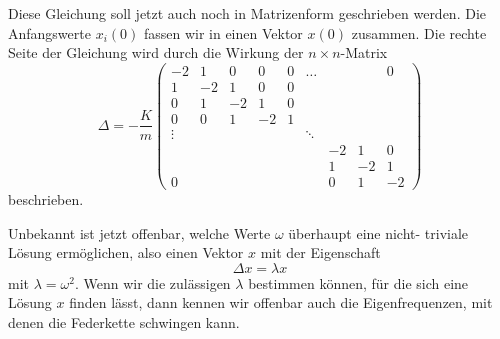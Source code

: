 Diese Gleichung soll jetzt auch noch in Matrizenform geschrieben werden.
Die Anfangswerte $x_i(0)$ fassen wir in einen Vektor $x(0)$ zusammen.
Die rechte Seite der Gleichung wird durch die Wirkung der $n\times n$-Matrix
\[
\Delta=
-\frac{K}{m}
\begin{pmatrix}
-2&1&0&0&0&\dots&&&0\\
1&-2&1&0&0&&&&\\
0&1&-2&1&0&&&&\\
0&0&1&-2&1&&&&\\
\vdots&&&&&\ddots&&\\
 &&&&&&-2&1&0\\
 &&&&&&1&-2&1\\
0&&&&&&0&1&-2
\end{pmatrix}
\]
beschrieben.

Unbekannt ist jetzt offenbar, welche Werte $\omega$ überhaupt eine nicht-%
triviale Lösung ermöglichen, also einen Vektor $x$ mit der Eigenschaft
\[
\Delta x=\lambda x
\]
mit $\lambda=\omega^2$.
Wenn wir die zulässigen $\lambda$ bestimmen können,
für die sich eine Lösung $x$ finden lässt, dann kennen wir offenbar auch
die Eigenfrequenzen, mit denen die Federkette schwingen kann.

